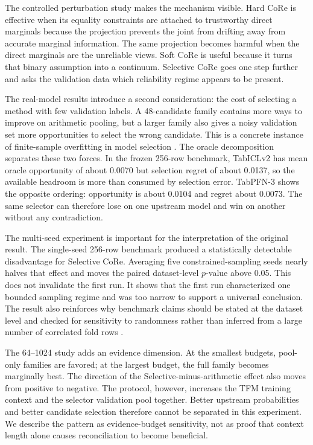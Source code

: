 \documentclass[a4paper,fleqn]{cas-sc}
\begin{document}
The controlled perturbation study makes the mechanism visible. Hard CoRe is effective when its equality constraints are attached to trustworthy direct marginals because the projection prevents the joint from drifting away from accurate marginal information. The same projection becomes harmful when the direct marginals are the unreliable views. Soft CoRe is useful because it turns that binary assumption into a continuum. Selective CoRe goes one step further and asks the validation data which reliability regime appears to be present.

The real-model results introduce a second consideration: the cost of selecting a method with few validation labels. A 48-candidate family contains more ways to improve on arithmetic pooling, but a larger family also gives a noisy validation set more opportunities to select the wrong candidate. This is a concrete instance of finite-sample overfitting in model selection \citep{cawley2010overfitting}. The oracle decomposition separates these two forces. In the frozen 256-row benchmark, TabICLv2 has mean oracle opportunity of about 0.0070 but selection regret of about 0.0137, so the available headroom is more than consumed by selection error. TabPFN-3 shows the opposite ordering: opportunity is about 0.0104 and regret about 0.0073. The same selector can therefore lose on one upstream model and win on another without any contradiction.

The multi-seed experiment is important for the interpretation of the original result. The single-seed 256-row benchmark produced a statistically detectable disadvantage for Selective CoRe. Averaging five constrained-sampling seeds nearly halves that effect and moves the paired dataset-level $p$-value above 0.05. This does not invalidate the first run. It shows that the first run characterized one bounded sampling regime and was too narrow to support a universal conclusion. The result also reinforces why benchmark claims should be stated at the dataset level and checked for sensitivity to randomness rather than inferred from a large number of correlated fold rows \citep{demsar2006comparisons}.

The 64--1024 study adds an evidence dimension. At the smallest budgets, pool-only families are favored; at the largest budget, the full family becomes marginally best. The direction of the Selective-minus-arithmetic effect also moves from positive to negative. The protocol, however, increases the TFM training context and the selector validation pool together. Better upstream probabilities and better candidate selection therefore cannot be separated in this experiment. We describe the pattern as evidence-budget sensitivity, not as proof that context length alone causes reconciliation to become beneficial.
\end{document}
